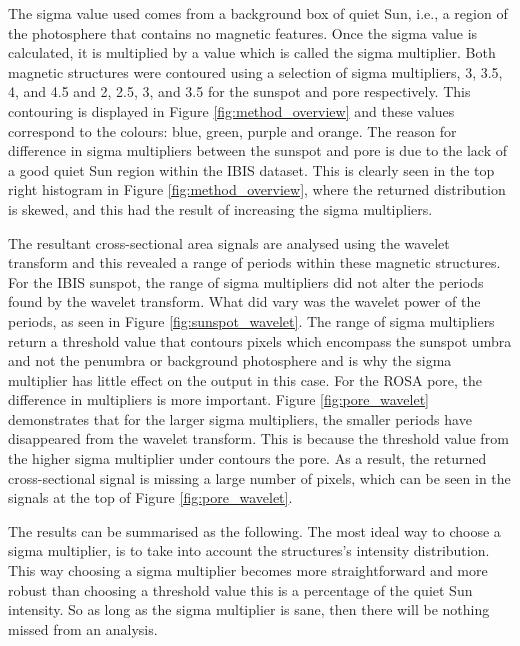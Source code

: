     The sigma value used comes from a background box of quiet Sun, i.e., a region of the photosphere that contains no magnetic features.
    Once the sigma value is calculated, it is multiplied by a value which is called the sigma multiplier.  
    Both magnetic structures were contoured using a selection of sigma multipliers, 3, 3.5, 4, and 4.5 and 2, 2.5, 3, and 3.5 for the sunspot and pore respectively.
    This contouring is displayed in Figure \ref{fig:method_overview} and these values correspond to the colours: blue, green, purple and orange.
    The reason for difference in sigma multipliers between the sunspot and pore is due to the lack of a good quiet Sun region within the IBIS dataset.
    This is clearly seen in the top right histogram in Figure \ref{fig:method_overview}, where the returned distribution is skewed, and this had the result of increasing the sigma multipliers.
    
    The resultant cross-sectional area signals are analysed using the wavelet transform and this revealed a range of periods within these magnetic structures.
    For the IBIS sunspot, the range of sigma multipliers did not alter the periods found by the wavelet transform.
    What did vary was the wavelet power of the periods, as seen in Figure \ref{fig:sunspot_wavelet}. 
    The range of sigma multipliers return a threshold value that contours pixels which encompass the sunspot umbra and not the penumbra or background photosphere and is why the sigma multiplier has little effect on the output in this case.
    For the ROSA pore, the difference in multipliers is more important.
    Figure \ref{fig:pore_wavelet} demonstrates that for the larger sigma multipliers, the smaller periods have disappeared from the wavelet transform. 
    This is because the threshold value from the higher sigma multiplier under contours the pore.
    As a result, the returned cross-sectional signal is missing a large number of pixels, which can be seen in the signals at the top of Figure \ref{fig:pore_wavelet}.
  
    The results can be summarised as the following.
    The most ideal way to choose a sigma multiplier, is to take into account the structures's intensity distribution.
    This way choosing a sigma multiplier becomes more straightforward and more robust than choosing a threshold value this is a percentage of the quiet Sun intensity.
    So as long as the sigma multiplier is sane, then there will be nothing missed from an analysis.
    
